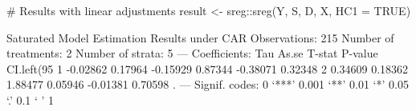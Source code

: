 \documentclass{article}
\begin{document}
\begin{rcode}
# Results with linear adjustments
result <- sreg::sreg(Y, S, D, X, HC1 = TRUE)

Saturated Model Estimation Results under CAR
Observations: 215 
Number of treatments: 2 
Number of strata: 5 
---
Coefficients:
       Tau   As.se   T-stat P-value CI.left(95%
1 -0.02862 0.17964 -0.15929 0.87344     -0.38071       0.32348             
2  0.34609 0.18362  1.88477 0.05946     -0.01381       0.70598            .
---
Signif. codes:  0 ‘***’ 0.001 ‘**’ 0.01 ‘*’ 0.05 ‘.’ 0.1 ‘ ’ 1

\end{rcode}
\end{document}
